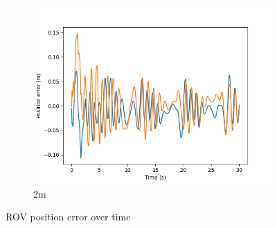 \documentclass[class=article, crop=false]{standalone}
\begin{document}
\begin{figure}
\begin{subfigure}[b]{0.48\textwidth}
        \centering
        \includegraphics{scenario1/rov-0m/2.0m/rov_position_error_uncontrolled}
        \caption{2m}
        \label{}
    \end{subfigure}

    \caption{ROV position error over time}
\end{figure}
\end{document}
